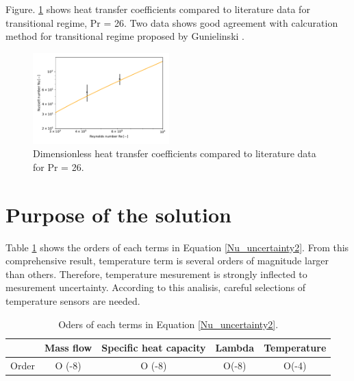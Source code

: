 \documentclass[conference]{IEEEtran}
\begin{document}
Figure. \ref{uncertainty} shows heat transfer coefficients compared to literature data for transitional regime, Pr = 26.
Two data shows good agreement with calcuration method for transitional regime proposed by Gunielinski \cite{Gnienlinski2010}.

\begin{figure}[htbp]
  \centering
  \vspace{5zh}
\includegraphics[width=0.47\textwidth,natwidth=400,natheight=200]{fig/uncertainty.pdf}
  \caption{Dimensionless heat transfer coefficients compared to literature data for Pr = 26.}
  \label{uncertainty}
\end{figure}


\section{Purpose of the solution}

Table \ref{order} shows the orders of each terms in Equation \ref{Nu_uncertainty2}.
From this comprehensive result, temperature term is several orders of magnitude larger than others.
Therefore, temperature mesurement is strongly inflected to mesurement uncertainty.
According to this analisis, careful selections of temperature sensors are needed.

\begin{table}[h]
 \caption{Oders of each terms in Equation \ref{Nu_uncertainty2}.}
 \label{order}
 \centering
 \begin{tabular}{ccccc}
\hline
      & Mass flow & Specific heat capacity & Lambda & Temperature \\ \hline
Order & O (-8)    & O (-8)                 & O(-8)  & O(-4)      
 \end{tabular}
\end{table}


\end{document}
